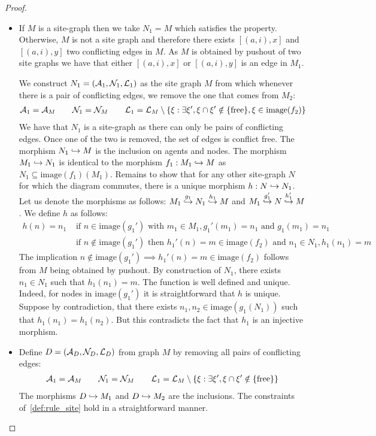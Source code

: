\begin{proof}
  \begin{itemize}
  \item If $M$ is a site-graph then we take $N_1=M$ which satisfies the property. Otherwise, $M$ is not a site graph and therefore there exists $[(a,i),x]$ and $[(a,i),y]$ two conflicting edges in $M$. As $M$ is obtained by pushout of two site graphs we have that either $[(a,i),x]$ or $[(a,i),y]$ is an edge in $M_1$.

    We construct $N_1 = (\mathcal{A}_1,\mathcal{N}_1,\mathcal{L}_1)$ as the site graph $M$ from which whenever there is a pair of conflicting edges, we remove the one that comes from $M_2$:
    \begin{align*}
      \mathcal{A}_1 = \mathcal{A}_M\qquad
      \mathcal{N}_1 = \mathcal{N}_M\qquad
      \mathcal{L}_1 = \mathcal{L}_M\setminus \{ \xi: \exists\xi', \xi\cap \xi'\notin\{\text{free}\}, \xi\in\text{image}(f_2) \}
    \end{align*}
    We have that $N_1$ is a site-graph as there can only be pairs of conflicting edges. Once one of the two is removed, the set of edges is conflict free. The morphism $N_1\hookrightarrow M$ is the inclusion on agents and nodes. The morphism $M_1\hookrightarrow N_1$ is identical to the morphism $f_1:M_1\hookrightarrow M$ as $N_1\subseteq\text{image}(f_1)(M_1)$. Remains to show that for any other site-graph $N$ for which the diagram commutes, there is a unique morphism $h:N\hookrightarrow N_1$.
    Let us denote the morphisms as follows: $M_1\overset{g_1}{\hookrightarrow}N_1\overset{h_1}{\hookrightarrow} M$ and $M_1\overset{g_1'}{\hookrightarrow}N\overset{h_1'}{\hookrightarrow} M$.
    We define $h$ as follows:
    \begin{align*}
      h(n) = n_1&\text{ if }n\in\text{image}(g_1')\text{ with }m_1\in M_1,g_1'(m_1) = n_1\text{ and }g_1(m_1)=n_1\\
      &\text{ if }n\notin\text{image}(g_1')\text{ then }h_1'(n)=m\in\text{image}(f_2)\text{ and }n_1\in N_1,h_1(n_1) = m
    \end{align*}
    The implication $n\notin\text{image}(g_1')\implies h_1'(n)=m\in\text{image}(f_2)$ follows from $M$ being obtained by pushout. By construction of $N_1$, there exists $n_1\in N_1$ such that $h_1(n_1) = m$. The function is well defined and unique. Indeed, for nodes in $\text{image}(g_1')$ it is straightforward that $h$ is unique. Suppose by contradiction, that there exists $n_1, n_2 \in \text{image}(g_1(N_1))$ such that $h_1(n_1)=h_1(n_2)$. But this contradicts the fact that $h_1$ is an injective morphism.

  \item Define $D=(\mathcal{A}_D,\mathcal{N}_D,\mathcal{L}_D)$ from graph $M$ by removing all pairs of conflicting edges:
    \begin{align*}
      \mathcal{A}_1 = \mathcal{A}_M\qquad
      \mathcal{N}_1 = \mathcal{N}_M\qquad
      \mathcal{L}_1 = \mathcal{L}_M\setminus \{ \xi: \exists\xi', \xi\cap \xi'\notin\{\text{\text{free}}\} \}
    \end{align*}
    The morphisms $D\hookrightarrow M_1$ and $D\hookrightarrow M_2$ are the inclusions. The constraints of~\autoref{def:rule_site} hold in a straightforward manner.
  \end{itemize}
\end{proof}
